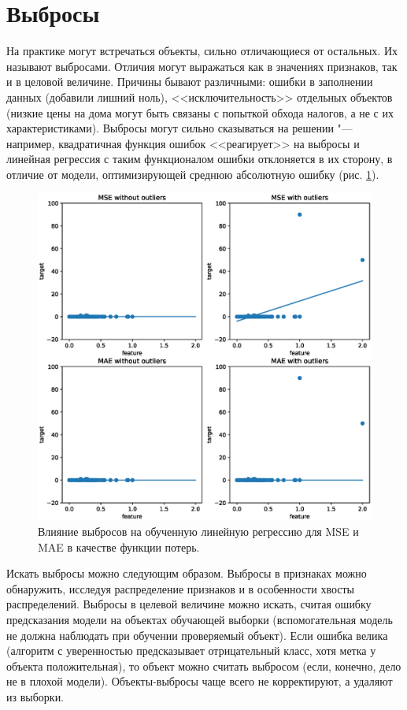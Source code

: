 \documentclass[12pt,fleqn]{article}
\begin{document}
\section{Выбросы}


На практике могут встречаться объекты, сильно отличающиеся от остальных. Их называют выбросами. Отличия могут выражаться как в значениях признаков, так и в целовой величине. Причины бывают различными: ошибки в заполнении данных (добавили лишний ноль), <<исключительность>> отдельных объектов (низкие цены на дома могут быть связаны с попыткой обхода налогов, а не с их характеристиками). Выбросы могут сильно сказываться на решении "--- например, квадратичная функция ошибок <<реагирует>> на выбросы и линейная регрессия с таким функционалом ошибки отклоняется в их сторону, в отличие от модели, оптимизирующей среднюю абсолютную ошибку (рис. \ref{fig:outliers}).

\begin{center}
    \begin{figure}[!htb]
        \centering
        \includegraphics[width=0.8\linewidth]{img/outliers.eps}
        \caption{Влияние выбросов на обученную линейную регрессию для MSE и MAE в качестве функции потерь.}\label{fig:outliers}
    \end{figure}
\end{center}

Искать выбросы можно следующим образом. Выбросы в признаках можно обнаружить, исследуя распределение признаков и в особенности хвосты распределений. Выбросы в целевой величине можно искать, считая ошибку предсказания модели на объектах обучающей выборки (вспомогательная модель не должна наблюдать при обучении проверяемый объект). Если ошибка велика (алгоритм с уверенностью предсказывает отрицательный класс, хотя метка у объекта положительная), то объект можно считать выбросом (если, конечно, дело не в плохой модели). Объекты-выбросы чаще всего не корректируют, а удаляют из выборки.
\end{document}

